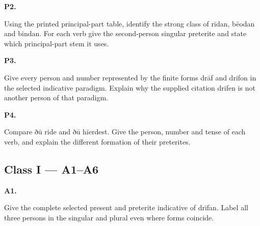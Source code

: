 \par\begin{minipage}{\linewidth}\raggedright
\textbf{P2.}

Using the printed principal-part table, identify the strong class of rīdan, bēodan and bindan. For each verb give the second-person singular preterite and state which principal-part stem it uses.

\end{minipage}\par\addvspace{4pt}

\par\begin{minipage}{\linewidth}\raggedright
\textbf{P3.}

Give every person and number represented by the finite forms drāf and drifon in the selected indicative paradigm. Explain why the supplied citation drifen is not another person of that paradigm.

\end{minipage}\par\addvspace{4pt}

\par\begin{minipage}{\linewidth}\raggedright
\textbf{P4.}

Compare ðū ride and ðū hīerdest. Give the person, number and tense of each verb, and explain the different formation of their preterites.

\end{minipage}\par\addvspace{4pt}

\subsection*{Class I — A1–A6}

\par\begin{minipage}{\linewidth}\raggedright
\textbf{A1.}

Give the complete selected present and preterite indicative of drīfan. Label all three persons in the singular and plural even where forms coincide.

\end{minipage}\par\addvspace{4pt}

